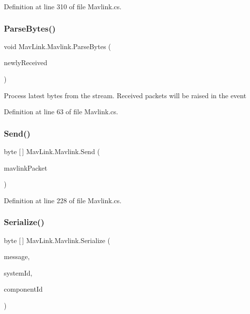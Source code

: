 Definition at line 310 of file Mavlink.\+cs.

\mbox{\label{classMavLink_1_1Mavlink_a2a1e66a440c767a640c92f00bdf5354d}} 
\subsubsection{\texorpdfstring{ParseBytes()}{ParseBytes()}}
{\footnotesize\ttfamily void Mav\+Link.\+Mavlink.\+Parse\+Bytes (\begin{DoxyParamCaption}\item[{byte \mbox{[}$\,$\mbox{]}}]{newly\+Received }\end{DoxyParamCaption})\hspace{0.3cm}{\ttfamily [inline]}}





Process latest bytes from the stream. Received packets will be raised in the event 

Definition at line 63 of file Mavlink.\+cs.

\mbox{\label{classMavLink_1_1Mavlink_a62a72045b3c41e9aade642a94af528aa}} 
\subsubsection{\texorpdfstring{Send()}{Send()}}
{\footnotesize\ttfamily byte \mbox{[}$\,$\mbox{]} Mav\+Link.\+Mavlink.\+Send (\begin{DoxyParamCaption}\item[{\mbox{\hyperlink{classMavLink_1_1MavlinkPacket}{Mavlink\+Packet}}}]{mavlink\+Packet }\end{DoxyParamCaption})\hspace{0.3cm}{\ttfamily [inline]}}



Definition at line 228 of file Mavlink.\+cs.

\mbox{\label{classMavLink_1_1Mavlink_ac10d67e2fbfb6e4ef9bc905b5ef2206b}} 
\subsubsection{\texorpdfstring{Serialize()}{Serialize()}}
{\footnotesize\ttfamily byte \mbox{[}$\,$\mbox{]} Mav\+Link.\+Mavlink.\+Serialize (\begin{DoxyParamCaption}\item[{Mavlink\+Message}]{message,  }\item[{int}]{system\+Id,  }\item[{int}]{component\+Id }\end{DoxyParamCaption})\hspace{0.3cm}{\ttfamily [inline]}}



